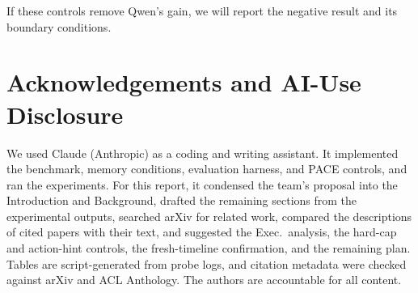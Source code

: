 \documentclass[11pt]{article}
\begin{document}
\noindent If these controls remove Qwen's gain, we will report the negative result and its boundary conditions.

\section*{Acknowledgements and AI-Use Disclosure}
We used Claude (Anthropic) as a coding and writing assistant. It implemented the benchmark, memory conditions, evaluation harness, and PACE controls, and ran the experiments. For this report, it condensed the team's proposal into the Introduction and Background, drafted the remaining sections from the experimental outputs, searched arXiv for related work, compared the descriptions of cited papers with their text, and suggested the Exec.\ analysis, the hard-cap and action-hint controls, the fresh-timeline confirmation, and the remaining plan. Tables are script-generated from probe logs, and citation metadata were checked against arXiv and ACL Anthology. The authors are accountable for all content.


\end{document}
